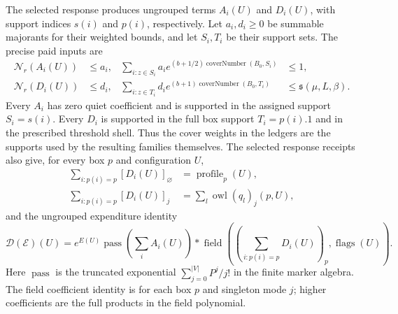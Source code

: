 The selected response produces ungrouped terms $A_i(U)$ and $D_i(U)$,
with support indices $s(i)$ and $p(i)$, respectively. Let $a_i,d_i\geq0$
be summable majorants for their weighted bounds, and let $S_i,T_i$ be
their support sets. The precise paid inputs are
\begin{align}
 \mathcal N_r(A_i(U))&\leq a_i,&
 \sum_{i:z\in S_i}a_i e^{(b+1/2)\operatorname{coverNumber}(B_0,S_i)}&\leq1,
 \label{eq:ex-lattice-volant-first-ledger}\\
 \mathcal N_r(D_i(U))&\leq d_i,&
 \sum_{i:z\in T_i}d_i e^{(b+1)\operatorname{coverNumber}(B_0,T_i)}&\leq
       \mathfrak s(\mu,L,\beta).
 \label{eq:ex-lattice-volant-second-ledger}
\end{align}
Every $A_i$ has zero quiet coefficient and is supported in the assigned
support $S_i=s(i)$. Every $D_i$ is supported in the full box support
$T_i=p(i).1$ and in the prescribed threshold shell. Thus the cover weights
in the ledgers are the supports used by the resulting families themselves.
The selected response receipts
also give, for every box $p$ and configuration $U$,
\begin{align}
 \sum_{i:p(i)=p}[D_i(U)]_{\varnothing}&=\operatorname{profile}_p(U),
 \label{eq:ex-lattice-volant-quiet}\\
 \sum_{i:p(i)=p}[D_i(U)]_j&=\sum_l\operatorname{owl}(q_l)_j(p,U),
 \label{eq:ex-lattice-volant-field}
\end{align}
and the ungrouped expenditure identity
\begin{equation}
 \mathcal D(\mathcal E)(U)=e^{E(U)}\operatorname{pass}\!\left(\sum_i A_i(U)\right)
 *\operatorname{field}\!\left((\sum_{i:p(i)=p}D_i(U))_p,
                            \operatorname{flags}(U)\right).
 \label{eq:ex-lattice-volant-play}
\end{equation}
Here $\operatorname{pass}$ is the truncated exponential $\sum_{j=0}^{|V|}P^j/j!$ in the finite marker algebra. The field coefficient identity is for each box $p$ and singleton mode $j$;
higher coefficients are the full products in the field polynomial.

